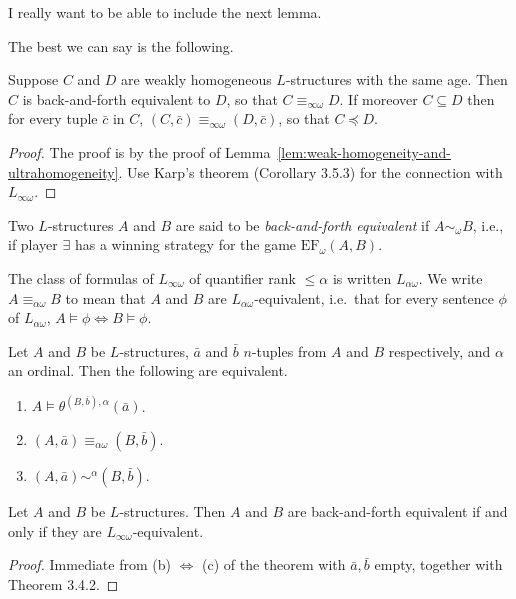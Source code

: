 \begin{mynote}
    I really want to be able to include the next lemma.
\end{mynote}

The best we can say is the following.


\begin{lemma}
    Suppose \( C \) and \( D \) are weakly homogeneous \( L \)-structures with the same age. Then \( C \) is  back-and-forth equivalent to \( D \), so that \( C \equiv_{\infty\omega} D \). If moreover \( C \subseteq D \) then for every tuple \( \bar{c} \) in \( C \), \( (C, \bar{c}) \equiv_{\infty\omega} (D, \bar{c}) \), so that \( C \preceq D \).
\end{lemma}

\begin{proof}
    The proof is by the proof of Lemma~\ref{lem:weak-homogeneity-and-ultrahomogeneity}. Use Karp's theorem (Corollary 3.5.3) for the connection with \( L_{\infty\omega} \).
\end{proof}

\begin{mynote}
    Two \( L \)-structures \( A \) and \( B \) are said to be \emph{back-and-forth equivalent} if \( A \sim_\omega B \), i.e., if player \( \exists \) has a winning strategy for the game \( \mathrm{EF}_\omega(A, B) \).

    The class of formulas of $L_{\infty \omega}$ of quantifier rank $\leq \alpha$ is written $L_{\alpha \omega}$. We write $A \equiv_{\alpha \omega} B$ to mean that $A$ and $B$ are $L_{\alpha \omega}$-equivalent, i.e.\ that for every sentence $\phi$ of $L_{\alpha \omega}$, $A \models \phi \Leftrightarrow B \models \phi$.

    \begin{theorem}[3.5.2]
        Let $A$ and $B$ be $L$-structures, $\bar{a}$ and $\bar{b}$ $n$-tuples from $A$ and $B$ respectively, and $\alpha$ an ordinal. Then the following are equivalent.
        \begin{enumerate}[label=(\alph*)]
            \item $A \models \theta^{(B,\bar{b}),\alpha}(\bar{a})$.
            \item $(A, \bar{a}) \equiv_{\alpha \omega} (B, \bar{b})$.
            \item $(A, \bar{a}) \sim^\alpha (B, \bar{b})$.
        \end{enumerate}
    \end{theorem}
    \begin{corollary}
        Let $A$ and $B$ be $L$-structures. Then $A$ and $B$ are back-and-forth equivalent if and only if they are $L_{\infty \omega}$-equivalent.
    \end{corollary}

    \begin{proof}
        Immediate from (b) $\Leftrightarrow$ (c) of the theorem with $\bar{a}, \bar{b}$ empty, together with Theorem 3.4.2.
    \end{proof}

\end{mynote}



